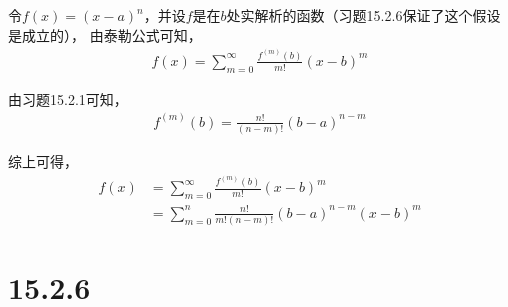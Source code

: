 \documentclass{article}
\begin{document}
令$f(x) = (x - a)^n$，并设$f$是在$b$处实解析的函数（习题15.2.6保证了这个假设是成立的），
由泰勒公式可知，
\begin{align*}
  f(x) = \sum\limits_{m = 0}^\infty \frac{f^{(m)}(b)}{m!}(x - b)^m
\end{align*}

由习题15.2.1可知，
\begin{align*}
  f^{(m)}(b) = \frac{n!}{(n - m)!}(b - a)^{n - m}
\end{align*}

综上可得，
\begin{align*}
  f(x) & = \sum\limits_{m = 0}^\infty \frac{f^{(m)}(b)}{m!}(x - b)^m            \\
       & = \sum\limits_{m = 0}^n \frac{n!}{m!(n - m)!} (b - a)^{n - m}(x - b)^m
\end{align*}

\section*{15.2.6}
\end{document}
